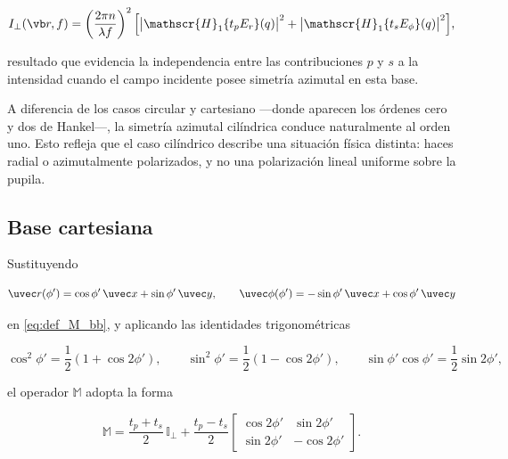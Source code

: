 \begin{equation}
  I_\perp(\vb r, f)
  =
  \left(\frac{2\pi n}{\lambda f}\right)^2
  \Big[
    \big|\mathscr{H}_1\{t_p E_r\}(q)\big|^2
    +
    \big|\mathscr{H}_1\{t_s E_\phi\}(q)\big|^2
  \Big],
  \label{eq:I_perp_cylindrical}
\end{equation}

resultado que evidencia la independencia entre las contribuciones $p$ y $s$ a la intensidad cuando el campo incidente posee simetría azimutal en esta base.

A diferencia de los casos circular y cartesiano —donde aparecen los órdenes cero y dos de Hankel—, la simetría azimutal cilíndrica conduce naturalmente al orden uno. Esto refleja que el caso cilíndrico describe una situación física distinta: haces radial o azimutalmente polarizados, y no una polarización lineal uniforme sobre la pupila.

\subsection{Base cartesiana}

Sustituyendo

\begin{equation}
\uvec r(\phi')
=
\cos\phi'\,\uvec x
+
\sin\phi'\,\uvec y,
\qquad
\uvec\phi(\phi')
=
-\sin\phi'\,\uvec x
+
\cos\phi'\,\uvec y
\end{equation}

en \eqref{eq:def_M_bb}, y aplicando las identidades trigonométricas

\begin{equation}
\cos^2\phi'
=
\frac{1}{2}(1+\cos2\phi'),
\qquad
\sin^2\phi'
=
\frac{1}{2}(1-\cos2\phi'),
\qquad
\sin\phi'\cos\phi'
=
\frac{1}{2}\sin2\phi',
\end{equation}

el operador $\mathbb{M}$ adopta la forma

\begin{equation}
  \mathbb{M}
  =
  \frac{t_p+t_s}{2}\,\mathbb{I}_\perp
  +
  \frac{t_p-t_s}{2}
  \begin{bmatrix}
    \cos 2\phi' & \sin 2\phi' \\
    \sin 2\phi' & -\cos 2\phi'
  \end{bmatrix}.
  \label{eq:M_in_cartesian_basis}
\end{equation}

